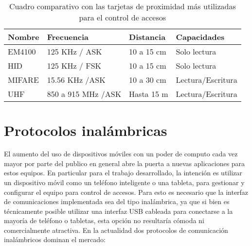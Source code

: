 \begin{table}[ht]
	\centering
	\caption[Tarjetas de proximidad más utilizadas en el control de accesos]{Cuadro comparativo con las tarjetas de proximidad más utilizadas para el control de accesos}
	\begin{tabular}{C{15mm} C{40mm} C{25mm} C{35mm}}
		\toprule
		\textbf{Nombre} 	
			& \textbf{Frecuencia}
			& \textbf{Distancia}	
			& \textbf{Capacidades}
			\\
		\midrule
			EM4100 			
			& 125 KHz / ASK
			& 10 a 15 cm	
			& Solo lectura
			\\
			HID 			
			& 125 KHz / FSK
			& 10 a 15 cm	
			& Solo lectura
			\\
			MIFARE 			
			& 15.56 KHz /ASK
			& 10 a 30 cm	
			& Lectura/Escritura
			\\
			UHF 			
			& 850 a 915 MHz /ASK
			& Hasta 15 m	
			& Lectura/Escritura
			\\
		\bottomrule
		\hline
	\end{tabular}
	\label{tab:TarjetasUsadas}
\end{table}

\section{Protocolos inalámbricas}

El aumento del uso de dispositivos móviles con un poder de computo cada vez mayor por parte del publico en general abre la puerta a nuevas aplicaciones para estos equipos. En particular para el trabajo desarrollado, la intención es utilizar un dispositivo móvil como un teléfono inteligente o una tableta, para gestionar y configurar el equipo para control de accesos. Para esto es necesario que la interfaz de comunicaciones implementada sea del tipo inalámbrica, ya que si bien es técnicamente posible utilizar una interfaz USB cableada para conectarse a la mayoría de teléfono o tabletas, esta opción no resultaría cómoda ni comercialmente atractiva. En la actualidad dos protocolos de comunicación inalámbricos dominan el mercado:

